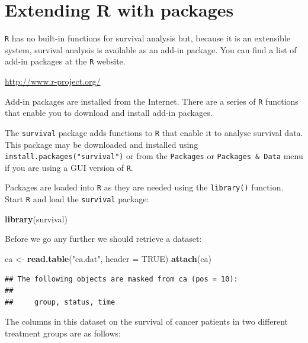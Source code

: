 \documentclass[12pt,a4paper]{book}
\newenvironment{Shaded}{\begin{snugshade}}{\end{snugshade}}
\newcommand{\KeywordTok}[1]{\textcolor[rgb]{0.13,0.29,0.53}{\textbf{#1}}}
\newcommand{\DataTypeTok}[1]{\textcolor[rgb]{0.13,0.29,0.53}{#1}}
\newcommand{\StringTok}[1]{\textcolor[rgb]{0.31,0.60,0.02}{#1}}
\newcommand{\OtherTok}[1]{\textcolor[rgb]{0.56,0.35,0.01}{#1}}
\newcommand{\NormalTok}[1]{#1}
\theoremstyle{definition}
\theoremstyle{definition}
\theoremstyle{definition}
\theoremstyle{remark}
\begin{document}
\hypertarget{exercise5}{%
\chapter{Extending R with packages}\label{exercise5}}

\texttt{R} has no built-in functions for survival analysis but, because
it is an extensible system, survival analysis is available as an add-in
package. You can find a list of add-in packages at the \texttt{R}
website.

\url{http://www.r-project.org/}

Add-in packages are installed from the Internet. There are a series of
\texttt{R} functions that enable you to download and install add-in
packages.

The \texttt{survival} package adds functions to \texttt{R} that enable
it to analyse survival data. This package may be downloaded and
installed using \texttt{install.packages("survival")} or from the
\texttt{Packages} or \texttt{Packages\ \&\ Data} menu if you are using a
GUI version of \texttt{R}.

Packages are loaded into \texttt{R} as they are needed using the
\texttt{library()} function. Start \texttt{R} and load the
\texttt{survival} package:

\begin{Shaded}
\begin{Highlighting}[]
\KeywordTok{library}\NormalTok{(survival)}
\end{Highlighting}
\end{Shaded}

Before we go any further we should retrieve a dataset:

\begin{Shaded}
\begin{Highlighting}[]
\NormalTok{ca <-}\StringTok{ }\KeywordTok{read.table}\NormalTok{(}\StringTok{"ca.dat"}\NormalTok{, }\DataTypeTok{header =} \OtherTok{TRUE}\NormalTok{)}
\KeywordTok{attach}\NormalTok{(ca)}
\end{Highlighting}
\end{Shaded}

\begin{verbatim}
## The following objects are masked from ca (pos = 10):
## 
##     group, status, time
\end{verbatim}

The columns in this dataset on the survival of cancer patients in two
different treatment groups are as follows:
\end{document}
